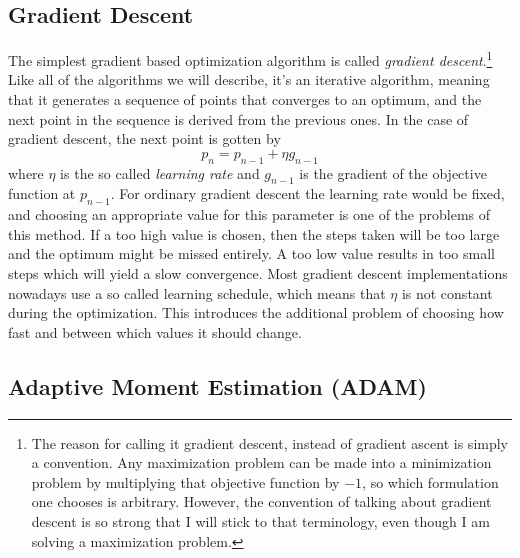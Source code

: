 \subsection{Gradient Descent}

The simplest gradient based optimization algorithm is called \emph{gradient
descent}.\footnote{%
	The reason for calling it gradient descent, instead of gradient ascent is
	simply a convention. Any maximization problem can be made into a
	minimization problem by multiplying that objective function by $-1$,
	so which formulation one chooses is arbitrary. However, the convention of
	talking about gradient descent is so strong that I will stick to that
	terminology, even though I am solving a maximization problem.%
}
Like all of the algorithms we will describe, it's an iterative algorithm,
meaning that it generates a sequence of points that converges to an optimum,
and the next point in the sequence is derived from the previous ones.
In the case of gradient descent, the next point is gotten by
\begin{equation}
	p_n = p_{n-1} + \eta g_{n-1}
\end{equation}
where $\eta$ is the so called \emph{learning rate} and $g_{n-1}$ is the gradient
of the objective function at $p_{n-1}$.
For ordinary gradient descent the learning rate would be fixed,
and choosing an appropriate value for this parameter is one of the problems of
this method.
If a too high value is chosen, then the steps taken will be too large and the
optimum might be missed entirely.
A too low value results in too small steps which will yield a slow convergence.
Most gradient descent implementations nowadays use a so called learning schedule,
which means that $\eta$ is not constant during the optimization.
This introduces the additional problem of choosing how fast and between
which values it should change.

\subsection{Adaptive Moment Estimation (ADAM)}

